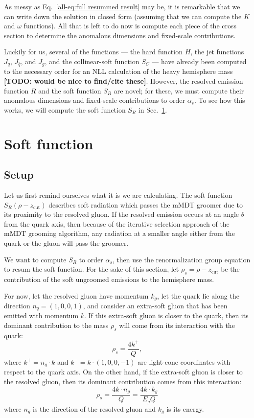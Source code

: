 \documentclass[../thesis.tex]{subfiles}
\providecommand{\zcut}{z_\mathrm{{cut}}}
\begin{document}
	As messy as Eq.~\ref{all-eq:full resummed result} may be, it is remarkable that we can write down the solution in closed form (assuming that we can compute the $K$ and $\omega$ functions). All that is left to do now is compute each piece of the cross section to determine the anomalous dimensions and fixed-scale contributions.

	Luckily for us, several of the functions --- the hard function $H$, the jet functions $J_q$, $J_{\bar q}$, and $J_g$, and the collinear-soft function $S_C$ --- have already been computed to the necessary order for an NLL calculation of the heavy hemisphere mass {\color{red}\textbf{[TODO: would be nice to find/cite these]}}. However, the resolved emission function $R$ and the soft function $S_R$ are novel; for these, we must compute their anomalous dimensions and fixed-scale contributions to order $\alpha_s$. To see how this works, we will compute the soft function $S_R$ in Sec.~\ref{all-sec:soft function calculation}.
	

\section{Soft function}\label{all-sec:soft function calculation}
\subsection{Setup}
	Let us first remind ourselves what it is we are calculating. The soft function $S_R(\rho - \zcut)$ describes soft radiation which passes the mMDT groomer due to its proximity to the resolved gluon. If the resolved emission occurs at an angle $\theta$ from the quark axis, then because of the iterative selection approach of the mMDT grooming algorithm, any radiation at a smaller angle either from the quark or the gluon will pass the groomer.

	We want to compute $S_R$ to order $\alpha_s$, then use the renormalization group equation to resum the soft function. For the sake of this section, let $\rho_s = \rho - \zcut$ be the contribution of the soft ungroomed emissions to the hemisphere mass.

	For now, let the resolved gluon have momentum $k_g$, let the quark lie along the direction $n_q = (1, 0, 0, 1)$, and consider an extra-soft gluon that has been emitted with momentum $k$. If this extra-soft gluon is closer to the quark, then its dominant contribution to the mass $\rho_s$ will come from its interaction with the quark:
	\begin{equation}
		\rho_s = \frac{4k^+}{Q},
	\end{equation}
	where $k^+ = n_q \cdot k$ and $k^- = k \cdot (1, 0, 0, -1)$ are light-cone coordinates with respect to the quark axis. On the other hand, if the extra-soft gluon is closer to the resolved gluon, then its dominant contribution comes from this interaction:
	\begin{equation}
		\rho_s = \frac{4 k \cdot n_g}{Q} = \frac{4 k \cdot k_g}{E_g Q}
	\end{equation}
	where $n_g$ is the direction of the resolved gluon and $k_g$ is its energy.
\end{document}
